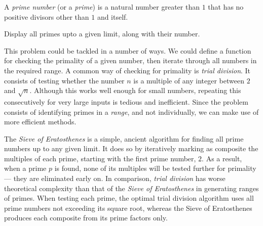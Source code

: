

\problem A {\em prime number} (or a {\em prime}) is a natural number greater than $1$ that has no positive divisors other than $1$ and itself.

Display all primes upto a given limit, along with their number.

\solution This problem could be tackled in a number of ways. We could define a function for checking the primality of a given number, then iterate through all numbers in the required range. A common way of checking for primality is {\em trial division}. It consists of testing whether the number $n$ is a multiple of any integer between $2$ and $\sqrt{n}$. Although this works well enough for small numbers, repeating this consecutively for very large inputs is tedious and inefficient. Since the problem consists of identifying primes in a {\em range}, and not individually, we can make use of more efficient methods.

The {\em Sieve of Eratosthenes} is a simple, ancient algorithm for finding all prime numbers up to any given limit.
It does so by iteratively marking as composite the multiples of each prime, starting with the first prime number, $2$.
As a result, when a prime $p$ is found, none of its multiples will be tested further for primality --- they are eliminated early on.
In comparison, {\em trial division} has worse theoretical complexity than that of the {\em Sieve of Eratosthenes} in generating ranges of primes. When testing each prime, the optimal trial division algorithm uses all prime numbers not exceeding its square root, whereas the Sieve of Eratosthenes produces each composite from its prime factors only. 

\sourcecode

